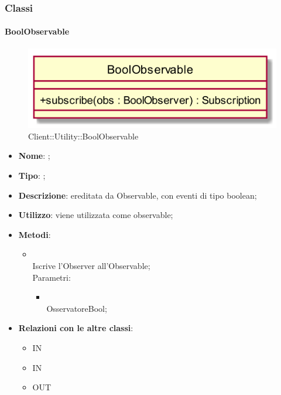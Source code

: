\subsubsection{Classi}
\hypertarget{BoolObservable_label}{\paragraph{BoolObservable}}
\begin{figure}[h]
	\centering
	\includegraphics[width=\textwidth,height=\textheight,keepaspectratio]{images/ClassBoolObservable.png}
	\caption{Client::Utility::BoolObservable}
\end{figure}
\begin{itemize}
	\item \textbf{Nome}: ;
	\item \textbf{Tipo}: ;
	\item \textbf{Descrizione}: ereditata da Observable, con eventi di tipo boolean;
	\item \textbf{Utilizzo}: viene utilizzata come observable;
	\item \textbf{Metodi}:
	\begin{itemize}
		\item[]  \\
		Iscrive l'Observer all'Observable;\\
		Parametri:
		\begin{itemize}
			\item {} \\
			OsservatoreBool;
		\end{itemize}
	\end{itemize}
	\item \textbf{Relazioni con le altre classi}:
	\begin{itemize}
		\item IN \hyperlink{Player_label}{}
		\item IN \hyperlink{BoolObserver_label}{}
		\item OUT \hyperlink{BoolSubject_label}{}
	\end{itemize}
\end{itemize}

